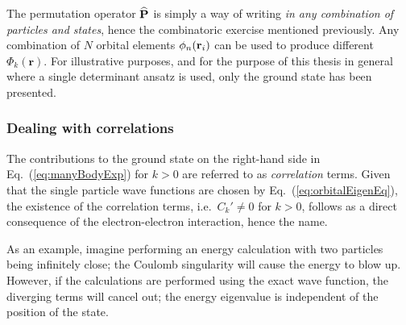 
The permutation operator ${\bf\widehat{P}}$ is simply a way of writing \textit{in any combination of particles and states}, hence the combinatoric exercise mentioned previously. Any combination of $N$ orbital elements $\phi_n(\mathbf{r}_i)$ can be used to produce different $\Phi_k(\mathbf{r})$. For illustrative purposes, and for the purpose of this thesis in general where a single determinant ansatz is used, only the ground state has been presented.  

\subsubsection{Dealing with correlations}

The contributions to the ground state on the right-hand side in Eq.~(\ref{eq:manyBodyExp}) for $k>0$ are referred to as \textit{correlation} terms. Given that the single particle wave functions are chosen by Eq.~(\ref{eq:orbitalEigenEq}), the existence of the correlation terms, i.e.~$C_k' \ne 0$ for $k>0$, follows as a direct consequence of the electron-electron interaction, hence the name.

As an example, imagine performing an energy calculation with two particles being infinitely close; the Coulomb singularity will cause the energy to blow up. However, if the calculations are performed using the exact wave function, the diverging terms will cancel out; the energy eigenvalue is independent of the position of the state. 

